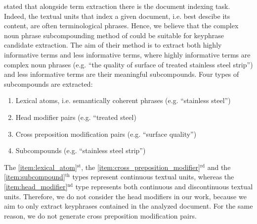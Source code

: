    stated that alongside term
  extraction there is the document indexing task. Indeed, the textual units that
  index a given document, i.e. best descibe its content, are often
  terminological phrases. Hence, we believe that the complex noun phrase
  subcompounding method of  could be
  suitable for keyphrase candidate extraction. The aim of their method is to
  extract both highly informative terms and less informative terms, where highly
  informative terms are complex noun phrases (e.g. ``the quality of surface of
  treated stainless steel strip'') and less  informative terms are
  their meaningful subcompounds. Four types of subcompounds are extracted:
  \begin{enumerate}
    \item{Lexical atoms, i.e. semantically coherent phrases (e.g. ``stainless
          steel'')
          \label{item:lexical_atom}}
    \item{Head modifier pairs (e.g. ``treated steel)
          \label{item:head_modifier}}
    \item{Cross preposition modification pairs (e.g. ``surface quality'')
          \label{item:cross_preposition_modifier}}
    \item{Subcompounds (e.g. ``stainless steel strip'')
          \label{item:subcompound}}
  \end{enumerate}
  The \ref{item:lexical_atom}$^\text{st}$, the
  \ref{item:cross_preposition_modifier}$^\text{rd}$ and the
  \ref{item:subcompound}$^\text{th}$ types represent continuous textual units,
  whereas the \ref{item:head_modifier}$^\text{nd}$ type represents both
  continuous and discontinuous textual units. Therefore, we do not
  consider the head modifiers in our work, because we aim to only extract
  keyphrases contained in the analyzed document. For the same reason, we do not
  generate cross preposition modification pairs.

